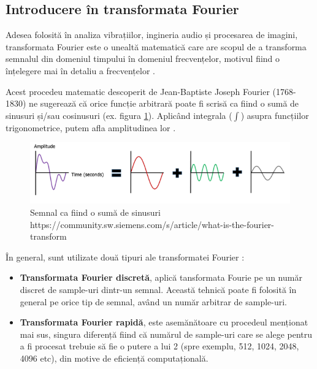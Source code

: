 \documentclass[a4paper,12pt]{report}
\begin{document}
	\clearpage
	\subsection{Introducere în transformata Fourier}
	Adesea folosită în analiza vibrațiilor, ingineria audio și procesarea de imagini, transformata Fourier este o unealtă matematică care are scopul de a transforma semnalul din domeniul timpului în domeniul frecvențelor, motivul fiind o înțelegere mai în detaliu a frecvențelor \cite{SISW_FT}.
	
	Acest procedeu matematic descoperit de Jean-Baptiste Joseph Fourier (1768-1830) ne sugerează că orice funcție arbitrară poate fi scrisă ca fiind o sumă de sinusuri și/sau cosinusuri (ex. figura \ref{fig:singal_to_sinuses}). Aplicând integrala ($\int $) asupra funcțiilor trigonometrice, putem afla amplitudinea lor .
	
	\begin{figure}[h]
		\includegraphics[width=\linewidth]{images/signals.png}
		\caption{Semnal ca fiind o sumă de sinusuri\newline
			\hspace{\linewidth}https://community.sw.siemens.com/s/article/what-is-the-fourier-transform}
		\label{fig:singal_to_sinuses}
	\end{figure}

		
	În general, sunt utilizate două tipuri ale transformatei Fourier :
	 \begin{itemize}
		\item \textbf{Transformata Fourier discretă}, aplică tansformata Fourie pe un număr discret de sample-uri dintr-un semnal. Această tehnică poate fi folosită în general pe orice tip de semnal, având un număr arbitrar de sample-uri.
		\item \textbf{Transformata Fourier rapidă}, este asemănătoare cu procedeul menționat mai sus, singura diferență fiind că numărul de sample-uri care se alege pentru a fi procesat trebuie să fie o putere a lui 2 (spre exemplu, 512, 1024, 2048, 4096 etc), din motive de eficiență computațională. 
	\end{itemize}
	
\end{document}
